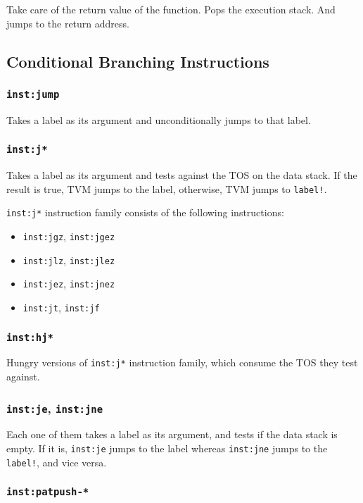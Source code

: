 \documentclass{article}
\newcommand{\inst}[1] {\texttt{inst:#1}}
\begin{document}
Take care of the return value of the function. Pops the execution stack. And jumps to the return address.

\subsection{Conditional Branching Instructions}

\subsubsection{\inst{jump}}

Takes a label as its argument and unconditionally jumps to that label.

\subsubsection{\inst{j*}}

Takes a label as its argument and tests against the TOS on the data stack. If the result is true, TVM jumps to the label, otherwise, TVM jumps to \texttt{label!}.

\inst{j*} instruction family consists of the following instructions:
\begin{itemize}
\item \inst{jgz}, \inst{jgez}
\item \inst{jlz}, \inst{jlez}
\item \inst{jez}, \inst{jnez}
\item \inst{jt}, \inst{jf}
\end{itemize}

\subsubsection{\inst{hj*}}

Hungry versions of \inst{j*} instruction family, which consume the TOS they test against.

\subsubsection{\inst{je}, \inst{jne}}

Each one of them takes a label as its argument, and tests if the data stack is empty. If it is, \inst{je} jumps to the label whereas \inst{jne} jumps to the \texttt{label!}, and vice versa.

\subsubsection{\inst{patpush-*}}
\end{document}

